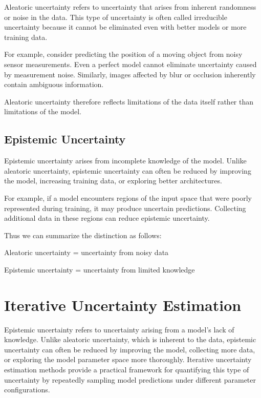 \documentclass{article}
\begin{document}
Aleatoric uncertainty refers to uncertainty that arises from inherent randomness or noise in the data. This type of uncertainty is often called irreducible uncertainty because it cannot be eliminated even with better models or more training data.

For example, consider predicting the position of a moving object from noisy sensor measurements. Even a perfect model cannot eliminate uncertainty caused by measurement noise. Similarly, images affected by blur or occlusion inherently contain ambiguous information.

Aleatoric uncertainty therefore reflects limitations of the data itself rather than limitations of the model.

\subsection{Epistemic Uncertainty}

Epistemic uncertainty arises from incomplete knowledge of the model. Unlike aleatoric uncertainty, epistemic uncertainty can often be reduced by improving the model, increasing training data, or exploring better architectures.

For example, if a model encounters regions of the input space that were poorly represented during training, it may produce uncertain predictions. Collecting additional data in these regions can reduce epistemic uncertainty.

Thus we can summarize the distinction as follows:

\begin{center}
Aleatoric uncertainty = uncertainty from noisy data

Epistemic uncertainty = uncertainty from limited knowledge
\end{center}


\section{Iterative Uncertainty Estimation}

Epistemic uncertainty refers to uncertainty arising from a model’s lack of knowledge. Unlike aleatoric uncertainty, which is inherent to the data, epistemic uncertainty can often be reduced by improving the model, collecting more data, or exploring the model parameter space more thoroughly. Iterative uncertainty estimation methods provide a practical framework for quantifying this type of uncertainty by repeatedly sampling model predictions under different parameter configurations.
\end{document}

